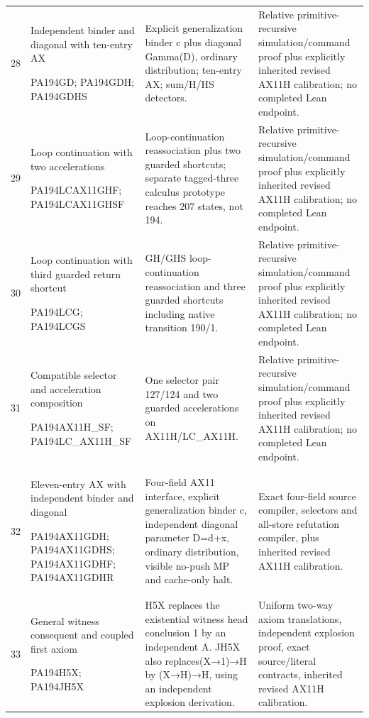 \begin{longtable}{p{0.25in}>{\raggedright\arraybackslash}p{1.55in}>{\raggedright\arraybackslash}p{2.10in}>{\raggedright\arraybackslash}p{2.00in}}
28&Independent binder and diagonal with ten-entry AX\par PA194GD; PA194GDH; PA194GDHS&Explicit generalization binder c plus diagonal Gamma(D), ordinary distribution; ten-entry AX; sum/H/HS detectors.&Relative primitive-recursive simulation/command proof plus explicitly inherited revised AX11H calibration; no completed Lean endpoint.\\[0.5em]
29&Loop continuation with two accelerations\par PA194LCAX11GHF; PA194LCAX11GHSF&Loop-continuation reassociation plus two guarded shortcuts; separate tagged-three calculus prototype reaches 207 states, not 194.&Relative primitive-recursive simulation/command proof plus explicitly inherited revised AX11H calibration; no completed Lean endpoint.\\[0.5em]
30&Loop continuation with third guarded return shortcut\par PA194LCG; PA194LCGS&GH/GHS loop-continuation reassociation and three guarded shortcuts including native transition 190/1.&Relative primitive-recursive simulation/command proof plus explicitly inherited revised AX11H calibration; no completed Lean endpoint.\\[0.5em]
31&Compatible selector and acceleration composition\par PA194AX11H\_SF; PA194LC\_AX11H\_SF&One selector pair 127/124 and two guarded accelerations on AX11H/LC\_AX11H.&Relative primitive-recursive simulation/command proof plus explicitly inherited revised AX11H calibration; no completed Lean endpoint.\\[0.5em]
32&Eleven-entry AX with independent binder and diagonal\par PA194AX11GDH; PA194AX11GDHS; PA194AX11GDHF; PA194AX11GDHR&Four-field AX11 interface, explicit generalization binder c, independent diagonal parameter D=d+x, ordinary distribution, visible no-push MP and cache-only halt.&Exact four-field source compiler, selectors and all-store refutation compiler, plus inherited revised AX11H calibration.\\[0.5em]
33&General witness consequent and coupled first axiom\par PA194H5X; PA194JH5X&H5X replaces the existential witness head conclusion 1 by an independent A. JH5X also replaces(X→1)→H by (X→H)→H, using an independent explosion derivation.&Uniform two-way axiom translations, independent explosion proof, exact source/literal contracts, inherited revised AX11H calibration.\\[0.5em]
\end{longtable}
\endgroup

